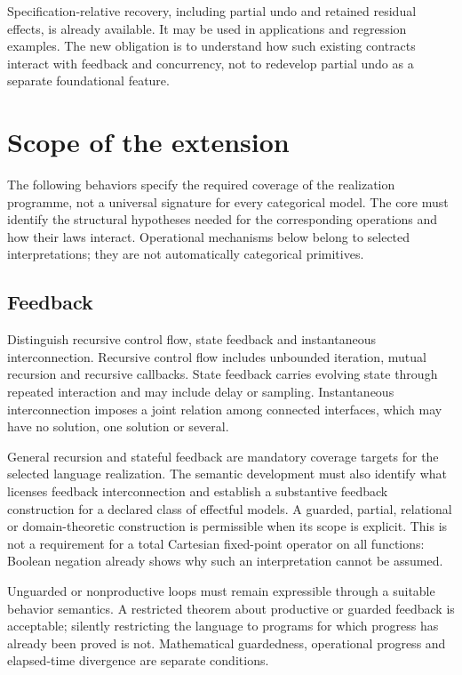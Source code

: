 \documentclass[11pt,a4paper]{article}
\begin{document}
Specification-relative recovery, including partial undo and retained residual effects, is already available. It may be used in applications and regression examples. The new obligation is to understand how such existing contracts interact with feedback and concurrency, not to redevelop partial undo as a separate foundational feature.

\section{Scope of the extension}\label{sec:scope}
The following behaviors specify the required coverage of the realization programme, not a universal signature for every categorical model. The core must identify the structural hypotheses needed for the corresponding operations and how their laws interact. Operational mechanisms below belong to selected interpretations; they are not automatically categorical primitives.

\subsection{Feedback}
Distinguish recursive control flow, state feedback and instantaneous interconnection. Recursive control flow includes unbounded iteration, mutual recursion and recursive callbacks. State feedback carries evolving state through repeated interaction and may include delay or sampling. Instantaneous interconnection imposes a joint relation among connected interfaces, which may have no solution, one solution or several.

General recursion and stateful feedback are mandatory coverage targets for the selected language realization. The semantic development must also identify what licenses feedback interconnection and establish a substantive feedback construction for a declared class of effectful models. A guarded, partial, relational or domain-theoretic construction is permissible when its scope is explicit. This is not a requirement for a total Cartesian fixed-point operator on all functions: Boolean negation already shows why such an interpretation cannot be assumed.

Unguarded or nonproductive loops must remain expressible through a suitable behavior semantics. A restricted theorem about productive or guarded feedback is acceptable; silently restricting the language to programs for which progress has already been proved is not. Mathematical guardedness, operational progress and elapsed-time divergence are separate conditions.
\end{document}
